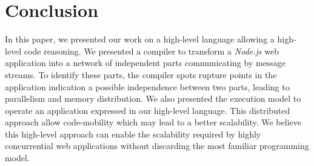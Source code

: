 \section{Conclusion} \label{section:conclusion}


In this paper, we presented our work on a high-level language allowing a high-level code reasoning.
We presented a compiler to transform a \textit{Node.js} web application into a network of independent parts communicating by message streams.
To identify these parts, the compiler spots rupture points in the application indication a possible independence between two parts, leading to parallelism and memory distribution.
We also presented the execution model to operate an application expressed in our high-level language.
This distributed approach allow code-mobility which may lead to a better scalability.
We believe this high-level approach can enable the scalability required by highly concurrential web applications without discarding the most familiar programming model.